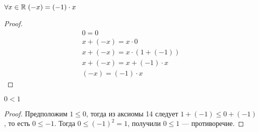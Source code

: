    \begin{theorem}
        $\forall x \in \mathbb{R} \; (-x) = (-1) \cdot x$
    \end{theorem} \begin{proof}
        \begin{gather*}
            0 = 0 \\
        x + (-x) = x \cdot 0 \\
        x + (-x) = x \cdot (1 + (-1)) \\
        x + (-x) = x + (-1) \cdot x \\
        (-x) = (-1) \cdot x
        \end{gather*}
    \end{proof}
    \begin{theorem}
        $ 0 < 1 $
    \end{theorem} \begin{proof}
        Предположим $ 1 \leq 0 $, тогда из аксиомы 14 следует $ 1 + (-1) \leq 0 + (-1) $, то есть $ 0 \leq - 1 $.
        Тогда $ 0 \leq ( - 1)^2 = 1 $, получили $ 0 \leq  1 $ --- противоречие.
    \end{proof}
